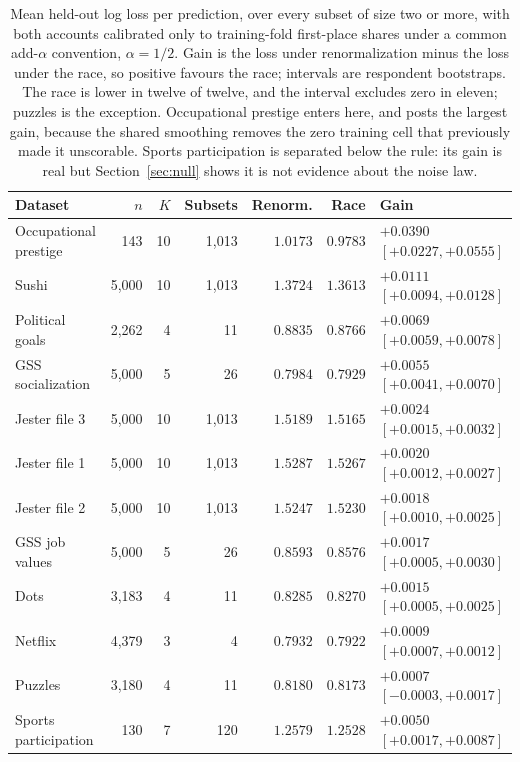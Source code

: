 \documentclass[11pt]{article}
\begin{document}
\begin{table}[ht]
\centering
\small
\begin{tabular}{lrrrrrl}
\toprule
Dataset & $n$ & $K$ & Subsets & Renorm. & Race & Gain \\
\midrule
Occupational prestige & 143 & 10 & 1{,}013 & $1.0173$ & $0.9783$ & $+0.0390$ $[+0.0227, +0.0555]$ \\
Sushi & 5{,}000 & 10 & 1{,}013 & $1.3724$ & $1.3613$ & $+0.0111$ $[+0.0094, +0.0128]$ \\
Political goals & 2{,}262 & 4 & 11 & $0.8835$ & $0.8766$ & $+0.0069$ $[+0.0059, +0.0078]$ \\
GSS socialization & 5{,}000 & 5 & 26 & $0.7984$ & $0.7929$ & $+0.0055$ $[+0.0041, +0.0070]$ \\
Jester file 3 & 5{,}000 & 10 & 1{,}013 & $1.5189$ & $1.5165$ & $+0.0024$ $[+0.0015, +0.0032]$ \\
Jester file 1 & 5{,}000 & 10 & 1{,}013 & $1.5287$ & $1.5267$ & $+0.0020$ $[+0.0012, +0.0027]$ \\
Jester file 2 & 5{,}000 & 10 & 1{,}013 & $1.5247$ & $1.5230$ & $+0.0018$ $[+0.0010, +0.0025]$ \\
GSS job values & 5{,}000 & 5 & 26 & $0.8593$ & $0.8576$ & $+0.0017$ $[+0.0005, +0.0030]$ \\
Dots & 3{,}183 & 4 & 11 & $0.8285$ & $0.8270$ & $+0.0015$ $[+0.0005, +0.0025]$ \\
Netflix & 4{,}379 & 3 & 4 & $0.7932$ & $0.7922$ & $+0.0009$ $[+0.0007, +0.0012]$ \\
Puzzles & 3{,}180 & 4 & 11 & $0.8180$ & $0.8173$ & $+0.0007$ $[-0.0003, +0.0017]$ \\
\midrule
Sports participation & 130 & 7 & 120 & $1.2579$ & $1.2528$ & $+0.0050$ $[+0.0017, +0.0087]$ \\
\bottomrule
\end{tabular}
\caption{Mean held-out log loss per prediction, over every subset of size two or
more, with both accounts calibrated only to training-fold first-place shares under a
common add-$\alpha$ convention, $\alpha = 1/2$. Gain is the loss under
renormalization minus the loss under the race, so positive favours the race;
intervals are respondent bootstraps. The race is lower in twelve of twelve, and the
interval excludes zero in eleven; puzzles is the exception. Occupational prestige
enters here, and posts the largest gain, because the shared smoothing removes the zero
training cell that previously made it unscorable. Sports participation is separated
below the rule: its gain is real but Section~\ref{sec:null} shows it is not evidence
about the noise law.}
\label{tab:heldout}
\end{table}
\end{document}
